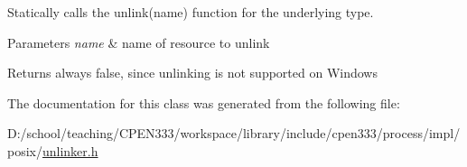 Statically calls the {\ttfamily unlink(name)} function for the underlying type. 


\begin{DoxyParams}{Parameters}
{\em name} & name of resource to unlink \\
\hline
\end{DoxyParams}
\begin{DoxyReturn}{Returns}
always {\ttfamily false}, since unlinking is not supported on Windows 
\end{DoxyReturn}


The documentation for this class was generated from the following file\+:\begin{DoxyCompactItemize}
\item 
D\+:/school/teaching/\+C\+P\+E\+N333/workspace/library/include/cpen333/process/impl/posix/\hyperlink{impl_2posix_2unlinker_8h}{unlinker.\+h}\end{DoxyCompactItemize}
